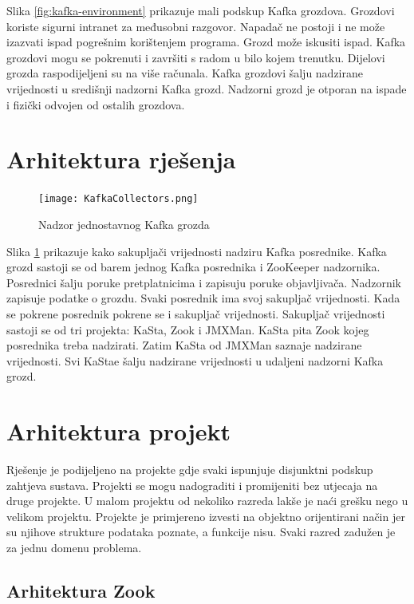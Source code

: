 \documentclass[utf8, diplomski, lmodern, numeric]{fer}
\begin{document}
Slika \ref{fig:kafka-environment} prikazuje mali podskup Kafka grozdova. Grozdovi koriste sigurni intranet za međusobni razgovor. Napadač ne postoji i ne može izazvati ispad pogrešnim korištenjem programa. Grozd može iskusiti ispad. Kafka grozdovi mogu se pokrenuti i završiti s radom u bilo kojem trenutku. Dijelovi grozda raspodijeljeni su na više računala. Kafka grozdovi šalju nadzirane vrijednosti u središnji nadzorni Kafka grozd. Nadzorni grozd je otporan na ispade i fizički odvojen od ostalih grozdova.


\section{Arhitektura rješenja}

\begin{figure}[H]
    \centering
    \texttt{[image: KafkaCollectors.png]}
    \caption{Nadzor jednostavnog Kafka grozda}
    \label{fig:collectors}
\end{figure}

Slika \ref{fig:collectors} prikazuje kako sakupljači vrijednosti nadziru Kafka posrednike. Kafka grozd sastoji se od barem jednog Kafka posrednika i ZooKeeper nadzornika. Posrednici šalju poruke pretplatnicima i zapisuju poruke objavljivača. Nadzornik zapisuje podatke o grozdu. Svaki posrednik ima svoj sakupljač vrijednosti. Kada se pokrene posrednik pokrene se i sakupljač vrijednosti. Sakupljač vrijednosti sastoji se od tri projekta: KaSta, Zook i JMXMan. KaSta pita Zook kojeg posrednika treba nadzirati. Zatim KaSta od JMXMan saznaje nadzirane vrijednosti. Svi KaStae šalju nadzirane vrijednosti u udaljeni nadzorni Kafka grozd.


\section{Arhitektura projekt}

Rješenje je podijeljeno na projekte gdje svaki ispunjuje disjunktni podskup zahtjeva sustava. Projekti se mogu nadograditi i promijeniti bez utjecaja na druge projekte. U malom projektu od nekoliko razreda lakše je naći grešku nego u velikom projektu. Projekte je primjereno izvesti na objektno orijentirani način jer su njihove strukture podataka poznate, a funkcije nisu. Svaki razred zadužen je za jednu domenu problema.

\subsection{Arhitektura Zook}
\end{document}
